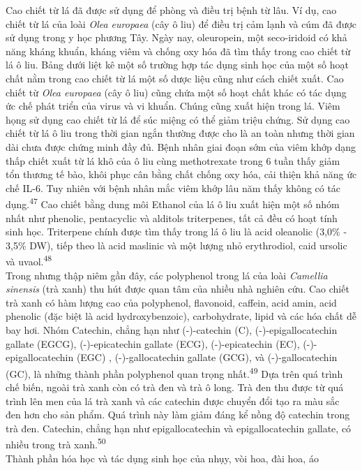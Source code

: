 \documentclass[
  letterpaper,
  DIV=11,
  numbers=noendperiod]{scrartcl}
\begin{document}
Cao chiết từ lá đã được sử dụng để phòng và điều trị bệnh từ lâu. Ví dụ,
cao chiết từ lá của loài \emph{Olea europaea} (cây ô liu) để điều trị
cảm lạnh và cúm đã được sử dụng trong y học phương Tây. Ngày nay,
oleuropein, một seco-iridoid có khả năng kháng khuẩn, kháng viêm và
chống oxy hóa đã tìm thấy trong cao chiết từ lá ô liu. Bảng dưới liệt kê
một số trường hợp tác dụng sinh học của một số hoạt chất nằm trong cao
chiết từ lá một số dược liệu cũng như cách chiết xuất. Cao chiết từ
\emph{Olea europaea} (cây ô liu) cũng chứa một số hoạt chất khác có tác
dụng ức chế phát triển của virus và vi khuẩn. Chúng cũng xuất hiện trong
lá. Viêm họng sử dụng cao chiết từ lá để súc miệng có thể giảm triệu
chứng. Sử dụng cao chiết từ lá ô liu trong thời gian ngắn thường được
cho là an toàn nhưng thời gian dài chưa được chứng minh đầy đủ. Bệnh
nhân giai đoạn sớm của viêm khớp dạng thấp chiết xuất từ lá khô của ô
liu cùng methotrexate trong 6 tuần thấy giảm tổn thương tế bào, khôi
phục cân bằng chất chống oxy hóa, cải thiện khả năng ức chế IL-6. Tuy
nhiên với bệnh nhân mắc viêm khớp lâu năm thấy không có tác
dụng.\textsuperscript{47} Cao chiết bằng dung môi Ethanol của lá ô liu
xuất hiện một số nhóm nhất như phenolic, pentacyclic và alditols
triterpenes, tất cả đều có hoạt tính sinh học. Triterpene chính được tìm
thấy trong lá ô liu là acid oleanolic (3,0\% - 3,5\% DW), tiếp theo là
acid maslinic và một lượng nhỏ erythrodiol, caid ursolic và
uvaol.\textsuperscript{48}\\
Trong nhưng thập niêm gần đây, các polyphenol trong lá của loài
\emph{Camellia sinensis} (trà xanh) thu hút được quan tâm của nhiều nhà
nghiên cứu. Cao chiết trà xanh có hàm lượng cao của polyphenol,
flavonoid, caffein, acid amin, acid phenolic (đặc biệt là acid
hydroxybenzoic), carbohydrate, lipid và các hóa chất dễ bay hơi. Nhóm
Catechin, chẳng hạn như (-)-catechin (C), (-)-epigallocatechin gallate
(EGCG), (-)-epicatechin gallate (ECG), (-)-epicatechin (EC),
(-)-epigallocatechin (EGC) , (-)-gallocatechin gallate (GCG), và
(-)-gallocatechin (GC), là những thành phần polyphenol quan trọng
nhất.\textsuperscript{49} Dựa trên quá trình chế biến, ngoài trà xanh
còn có trà đen và trà ô long. Trà đen thu được từ quá trình lên men của
lá trà xanh và các catechin được chuyển đổi tạo ra màu sắc đen hơn cho
sản phẩm. Quá trình này làm giảm đáng kể nồng độ catechin trong trà đen.
Catechin, chẳng hạn như epigallocatechin và epigallocatechin gallate, có
nhiều trong trà xanh.\textsuperscript{50}\\
Thành phần hóa học và tác dụng sinh học của nhụy, vòi hoa, đài hoa, áo
\end{document}
